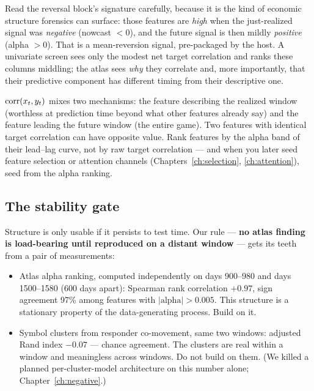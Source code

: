 Read the reversal block's signature carefully, because it is the kind of
economic structure forensics can surface: those features are \emph{high}
when the just-realized signal was \emph{negative} (nowcast $< 0$), and the
future signal is then mildly \emph{positive} (alpha $> 0$). That is a
mean-reversion signal, pre-packaged by the host. A univariate screen sees
only the modest net target correlation and ranks these columns middling;
the atlas sees \emph{why} they correlate and, more importantly, that their
predictive component has different timing from their descriptive one.

\begin{warnbox}
$\operatorname{corr}(x_t, y_t)$ mixes two mechanisms: the feature describing the realized
window (worthless at prediction time beyond what other features already
say) and the feature leading the future window (the entire game). Two
features with identical target correlation can have opposite value. Rank
features by the alpha band of their lead--lag curve, not by raw target
correlation --- and when you later seed feature selection or attention
channels (Chapters~\ref{ch:selection}, \ref{ch:attention}), seed from the
alpha ranking.
\end{warnbox}

\subsection{The stability gate}

Structure is only usable if it persists to test time. Our rule ---
\textbf{no atlas finding is load-bearing until reproduced on a distant
window} --- gets its teeth from a pair of measurements:

\begin{itemize}
\item Atlas alpha ranking, computed independently on days 900--980 and
  days 1500--1580 (600 days apart): Spearman rank correlation
  \textbf{$+0.97$}, sign agreement 97\% among features with
  $|\text{alpha}| > 0.005$. This structure is a stationary property of the
  data-generating process. Build on it.
\item Symbol clusters from responder co-movement, same two windows:
  adjusted Rand index \textbf{$-0.07$} --- chance agreement. The clusters
  are real within a window and meaningless across windows. Do not build on
  them. (We killed a planned per-cluster-model architecture on this
  number alone; Chapter~\ref{ch:negative}.)
\end{itemize}

